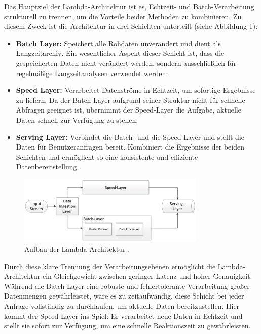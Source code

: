 Das Hauptziel der Lambda-Architektur ist es, Echtzeit- und Batch-Verarbeitung strukturell zu trennen, um die Vorteile beider Methoden zu kombinieren. Zu diesem Zweck ist die Architektur in drei Schichten unterteilt (siehe Abbildung 1):

\begin{itemize}
	\item \textbf{Batch Layer:} Speichert alle Rohdaten unverändert und dient als Langzeitarchiv. Ein wesentlicher Aspekt dieser Schicht ist, dass die gespeicherten Daten nicht verändert werden, sondern ausschließlich für regelmäßige Langzeitanalysen verwendet werden.
	\item \textbf{Speed Layer:} Verarbeitet Datenströme in Echtzeit, um sofortige Ergebnisse zu liefern. Da der Batch-Layer aufgrund seiner Struktur nicht für schnelle Abfragen geeignet ist, übernimmt der Speed-Layer die Aufgabe, aktuelle Daten schnell zur Verfügung zu stellen.
	\item \textbf{Serving Layer:} Verbindet die Batch- und die Speed-Layer und stellt die Daten für Benutzeranfragen bereit. Kombiniert die Ergebnisse der beiden Schichten und ermöglicht so eine konsistente und effiziente Datenbereitstellung.
\end{itemize}


\begin{figure}[h] %
    \centering
    \includegraphics[width=0.8\textwidth]{Graphics/Lambda_Architecture.png} %
    \caption{Aufbau der Lambda-Architektur \cite{entwickler_lambda_kappa}.}
    \label{fig:beispielbild}
\end{figure}

Durch diese klare Trennung der Verarbeitungsebenen ermöglicht die Lambda-Architektur ein Gleichgewicht zwischen geringer Latenz und hoher Genauigkeit. Während die Batch Layer eine robuste und fehlertolerante Verarbeitung großer Datenmengen gewährleistet, wäre es zu zeitaufwändig, diese Schicht bei jeder Anfrage vollständig zu durchlaufen, um aktuelle Daten bereitzustellen. Hier kommt der Speed Layer ins Spiel: Er verarbeitet neue Daten in Echtzeit und stellt sie sofort zur Verfügung, um eine schnelle Reaktionszeit zu gewährleisten.

